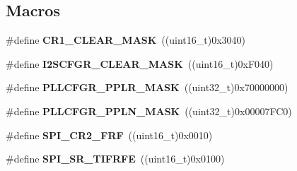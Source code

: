 \subsection*{Macros}
\begin{DoxyCompactItemize}
\item 
\mbox{\label{group___s_p_i_ga8d425258898b4af4ebc820f52635fad8}} 
\#define {\bfseries C\+R1\+\_\+\+C\+L\+E\+A\+R\+\_\+\+M\+A\+SK}~((uint16\+\_\+t)0x3040)
\item 
\mbox{\label{group___s_p_i_ga441f8283b9c46535e05ae7e520728033}} 
\#define {\bfseries I2\+S\+C\+F\+G\+R\+\_\+\+C\+L\+E\+A\+R\+\_\+\+M\+A\+SK}~((uint16\+\_\+t)0x\+F040)
\item 
\mbox{\label{group___s_p_i_ga7fb18a9c4bcfc2b92c8c58f6bfe99876}} 
\#define {\bfseries P\+L\+L\+C\+F\+G\+R\+\_\+\+P\+P\+L\+R\+\_\+\+M\+A\+SK}~((uint32\+\_\+t)0x70000000)
\item 
\mbox{\label{group___s_p_i_ga7c3555ba01e070847f1475d2578332ed}} 
\#define {\bfseries P\+L\+L\+C\+F\+G\+R\+\_\+\+P\+P\+L\+N\+\_\+\+M\+A\+SK}~((uint32\+\_\+t)0x00007\+F\+C0)
\item 
\mbox{\label{group___s_p_i_ga09e3f41fa2150831afaac191046087f2}} 
\#define {\bfseries S\+P\+I\+\_\+\+C\+R2\+\_\+\+F\+RF}~((uint16\+\_\+t)0x0010)
\item 
\mbox{\label{group___s_p_i_gac2a833b915e27cd63a5fc416d9002472}} 
\#define {\bfseries S\+P\+I\+\_\+\+S\+R\+\_\+\+T\+I\+F\+R\+FE}~((uint16\+\_\+t)0x0100)
\end{DoxyCompactItemize}
